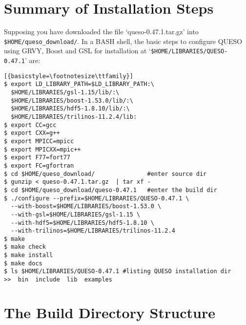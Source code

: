 \section{Summary of Installation Steps}\label{sec:summary}


Supposing you have downloaded the file `queso-0.47.1.tar.gz' into \texttt{\$HOME/queso\_download/}.
%
In a BASH shell, the basic steps to configure QUESO using GRVY, Boost and GSL for installation at 
`\verb+$HOME/LIBRARIES/QUESO-0.47.1+'  are:

\begin{lstlisting}[{basicstyle=\footnotesize\ttfamily}]
$ export LD_LIBRARY_PATH=$LD_LIBRARY_PATH:\
  $HOME/LIBRARIES/gsl-1.15/lib/:\
  $HOME/LIBRARIES/boost-1.53.0/lib/:\
  $HOME/LIBRARIES/hdf5-1.8.10/lib/:\
  $HOME/LIBRARIES/trilinos-11.2.4/lib:
$ export CC=gcc
$ export CXX=g++
$ export MPICC=mpicc
$ export MPICXX=mpic++
$ export F77=fort77
$ export FC=gfortran
$ cd $HOME/queso_download/               #enter source dir
$ gunzip < queso-0.47.1.tar.gz  | tar xf -
$ cd $HOME/queso_download/queso-0.47.1   #enter the build dir
$ ./configure --prefix=$HOME/LIBRARIES/QUESO-0.47.1 \
  --with-boost=$HOME/LIBRARIES/boost-1.53.0 \
  --with-gsl=$HOME/LIBRARIES/gsl-1.15 \
  --with-hdf5=$HOME/LIBRARIES/hdf5-1.8.10 \
  --with-trilinos=$HOME/LIBRARIES/trilinos-11.2.4
$ make 
$ make check
$ make install 
$ make docs
$ ls $HOME/LIBRARIES/QUESO-0.47.1 #listing QUESO installation dir
>>  bin  include  lib  examples
\end{lstlisting}

% 
% 


\section{The Build Directory Structure} \label{sc-source-dir-structure}

